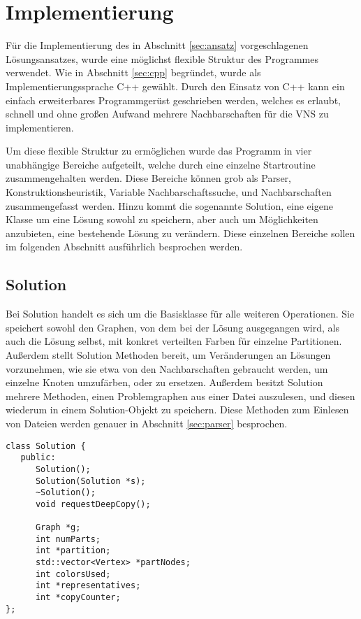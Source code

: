 \chapter{Implementierung}
Für die Implementierung des in Abschnitt \ref{sec:ansatz} vorgeschlagenen Lösungsansatzes, wurde eine möglichst flexible Struktur des Programmes verwendet. Wie in Abschnitt \ref{sec:cpp} begründet, wurde
als Implementierungssprache C++ gewählt. Durch den Einsatz von C++ kann ein einfach erweiterbares Programmgerüst geschrieben werden, welches es erlaubt, schnell und ohne großen Aufwand mehrere Nachbarschaften
für die VNS zu implementieren. 

Um diese flexible Struktur zu ermöglichen wurde das Programm in vier unabhängige Bereiche aufgeteilt, welche durch eine einzelne Startroutine zusammengehalten werden. Diese Bereiche können grob als Parser, 
Konstruktionsheuristik, Variable Nachbarschaftssuche, und Nachbarschaften zusammengefasst werden. Hinzu kommt die sogenannte Solution, eine eigene Klasse um eine Lösung sowohl zu speichern, aber auch um Möglichkeiten
anzubieten, eine bestehende Lösung zu verändern. Diese einzelnen Bereiche sollen im folgenden Abschnitt ausführlich besprochen werden.

\section{Solution}
Bei Solution handelt es sich um die Basisklasse für alle weiteren Operationen. Sie speichert sowohl den Graphen, von dem bei der Lösung ausgegangen wird, als auch die Lösung selbst, mit konkret verteilten Farben
für einzelne Partitionen. Außerdem stellt Solution Methoden bereit, um Veränderungen an Lösungen vorzunehmen, wie sie etwa von den Nachbarschaften gebraucht werden, um einzelne Knoten umzufärben, oder zu ersetzen.
Außerdem besitzt Solution mehrere Methoden, einen Problemgraphen aus einer Datei auszulesen, und diesen wiederum in einem Solution-Objekt zu speichern. Diese Methoden zum Einlesen von Dateien werden genauer 
in Abschnitt \ref{sec:parser} besprochen.

\singlespacing
\begin{lstlisting}[caption={Ein Ausschnitt aus der Signatur der Solutionklasse},label=lst:solution]
class Solution {
   public:
      Solution();
      Solution(Solution *s);
      ~Solution(); 
      void requestDeepCopy();

      Graph *g;
      int numParts;
      int *partition;
      std::vector<Vertex> *partNodes;
      int colorsUsed;
      int *representatives;
      int *copyCounter;
};
\end{lstlisting}

